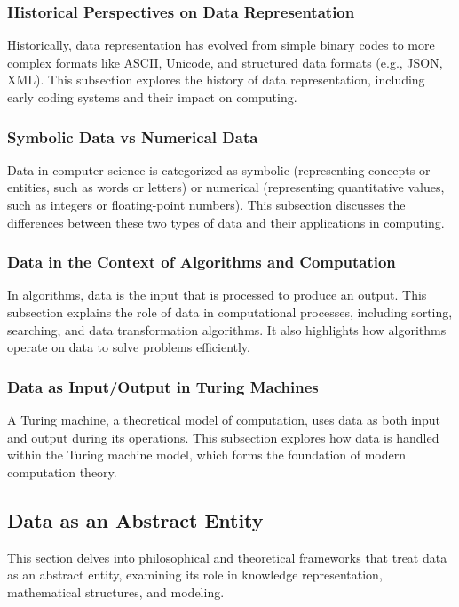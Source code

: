 \documentclass[12pt, oneside]{book}
\begin{document}
\subsubsection{Historical Perspectives on Data Representation}
Historically, data representation has evolved from simple binary codes to more complex formats like ASCII, Unicode, and structured data formats (e.g., JSON, XML). This subsection explores the history of data representation, including early coding systems and their impact on computing.

\subsubsection{Symbolic Data vs Numerical Data}
Data in computer science is categorized as symbolic (representing concepts or entities, such as words or letters) or numerical (representing quantitative values, such as integers or floating-point numbers). This subsection discusses the differences between these two types of data and their applications in computing.

\subsubsection{Data in the Context of Algorithms and Computation}
In algorithms, data is the input that is processed to produce an output. This subsection explains the role of data in computational processes, including sorting, searching, and data transformation algorithms. It also highlights how algorithms operate on data to solve problems efficiently.

\subsubsection{Data as Input/Output in Turing Machines}
A Turing machine, a theoretical model of computation, uses data as both input and output during its operations. This subsection explores how data is handled within the Turing machine model, which forms the foundation of modern computation theory.

\subsection{Data as an Abstract Entity}
This section delves into philosophical and theoretical frameworks that treat data as an abstract entity, examining its role in knowledge representation, mathematical structures, and modeling.
\end{document}
